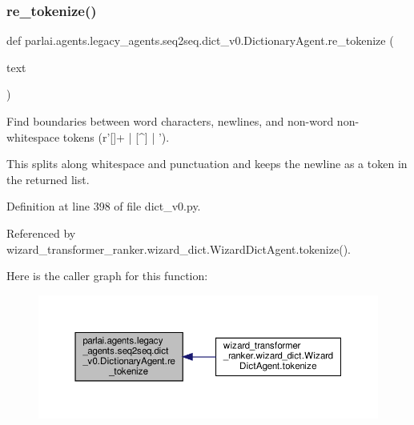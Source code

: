 \subsubsection{\texorpdfstring{re\+\_\+tokenize()}{re\_tokenize()}}
{\footnotesize\ttfamily def parlai.\+agents.\+legacy\+\_\+agents.\+seq2seq.\+dict\+\_\+v0.\+Dictionary\+Agent.\+re\+\_\+tokenize (\begin{DoxyParamCaption}\item[{}]{text }\end{DoxyParamCaption})\hspace{0.3cm}{\ttfamily [static]}}

\begin{DoxyVerb}Find boundaries between word characters, newlines, and non-word
non-whitespace tokens (r'[\w\n]+ | [^\w\s] | \n').

This splits along whitespace and punctuation and keeps the newline as
a token in the returned list.
\end{DoxyVerb}
 

Definition at line 398 of file dict\+\_\+v0.\+py.



Referenced by wizard\+\_\+transformer\+\_\+ranker.\+wizard\+\_\+dict.\+Wizard\+Dict\+Agent.\+tokenize().

Here is the caller graph for this function\+:
\nopagebreak
\begin{figure}[H]
\begin{center}
\leavevmode
\includegraphics[width=350pt]{classparlai_1_1agents_1_1legacy__agents_1_1seq2seq_1_1dict__v0_1_1DictionaryAgent_a11a20a1798b9c939e2b7347b9d799e7b_icgraph}
\end{center}
\end{figure}
\mbox{\label{classparlai_1_1agents_1_1legacy__agents_1_1seq2seq_1_1dict__v0_1_1DictionaryAgent_accabae63114f30e336e560ee1b7420da}} 
